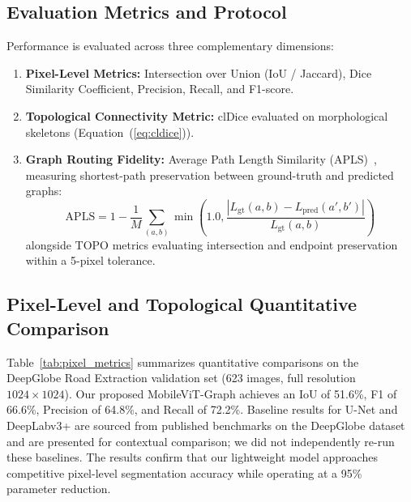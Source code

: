 \documentclass[conference]{IEEEtran}
\begin{document}
\subsection{Evaluation Metrics and Protocol}
Performance is evaluated across three complementary dimensions:
\begin{enumerate}
    \item \textbf{Pixel-Level Metrics:} Intersection over Union (IoU / Jaccard), Dice Similarity Coefficient, Precision, Recall, and F1-score.
    \item \textbf{Topological Connectivity Metric:} clDice evaluated on morphological skeletons (Equation~(\ref{eq:cldice})).
    \item \textbf{Graph Routing Fidelity:} Average Path Length Similarity (APLS)~\cite{vanetten2018spacenet}, measuring shortest-path preservation between ground-truth and predicted graphs:
    \begin{equation}
        \text{APLS} = 1 - \frac{1}{M} \sum_{(a, b)} \min\left(1.0, \frac{|L_{\text{gt}}(a, b) - L_{\text{pred}}(a', b')|}{L_{\text{gt}}(a, b)}\right)
    \end{equation}
    alongside TOPO metrics evaluating intersection and endpoint preservation within a 5-pixel tolerance.
\end{enumerate}

\subsection{Pixel-Level and Topological Quantitative Comparison}
Table~\ref{tab:pixel_metrics} summarizes quantitative comparisons on the DeepGlobe Road Extraction validation set (623 images, full resolution $1024\times1024$). Our proposed MobileViT-Graph achieves an IoU of 51.6\%, F1 of 66.6\%, Precision of 64.8\%, and Recall of 72.2\%. Baseline results for U-Net and DeepLabv3+ are sourced from published benchmarks on the DeepGlobe dataset~\cite{demir2018deepglobe} and are presented for contextual comparison; we did not independently re-run these baselines. The results confirm that our lightweight model approaches competitive pixel-level segmentation accuracy while operating at a 95\% parameter reduction.
\end{document}
